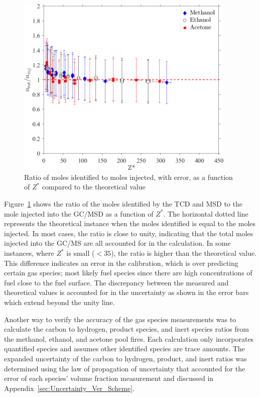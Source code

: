 \documentclass[12pt]{article}
\begin{document}
\begin{figure}[h!]
	\centering
\includegraphics[width=10.5cm,keepaspectratio]{mole_ratio_Comparison.png}
	\caption[Ratio of moles identified to moles injected, with error, as a function of $Z^{*}$]{Ratio of moles identified to moles injected, with error, as a function of $Z^{*}$ compared to the theoretical value}
	\label{fig:Mole_Comp}
\end{figure}

Figure~\ref{fig:Mole_Comp} shows the ratio of the moles identified by the TCD and MSD to the mole injected into the GC/MSD as a function of $Z^{*}$. The horizontal dotted line represents the theoretical instance when the moles identified is equal to the moles injected. In most cases, the ratio is close to unity, indicating that the total moles injected into the GC/MS are all accounted for in the calculation. In some instances, where $Z^{*}$ is small ($<35$), the ratio is higher than the theoretical value. This difference indicates an error in the calibration, which is over predicting certain gas species; most likely fuel species since there are high concentrations of fuel close to the fuel surface. The discrepancy between the measured and theoretical values is accounted for in the uncertainty as shown in the error bars which extend beyond the unity line. 

Another way to verify the accuracy of the gas species measurements was to calculate the carbon to hydrogen, product species, and inert species ratios from the methanol, ethanol, and acetone pool fires. Each calculation only incorporates quantified species and assumes other identified species are trace amounts. The expanded uncertainty of the carbon to hydrogen, product, and inert ratios was determined using the law of propagation of uncertainty that accounted for the error of each species' volume fraction measurement and discussed in Appendix~\ref{sec:Uncertainty_Ver_Scheme}. 
\end{document}
